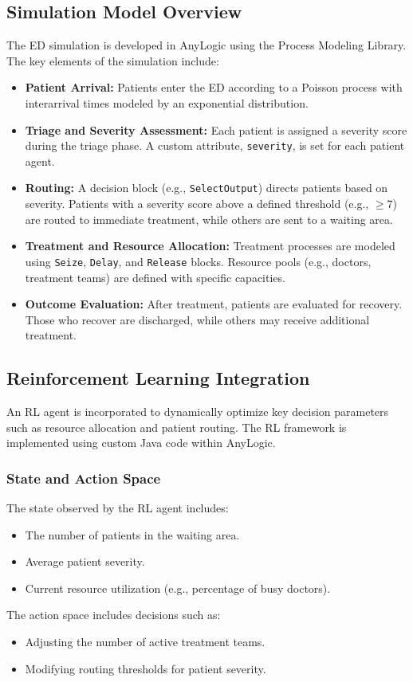 \documentclass[12pt]{article}
\begin{document}
\subsection{Simulation Model Overview}
The ED simulation is developed in AnyLogic using the Process Modeling Library. The key elements of the simulation include:
\begin{itemize}[noitemsep]
    \item \textbf{Patient Arrival:} Patients enter the ED according to a Poisson process with interarrival times modeled by an exponential distribution.
    \item \textbf{Triage and Severity Assessment:} Each patient is assigned a severity score during the triage phase. A custom attribute, \texttt{severity}, is set for each patient agent.
    \item \textbf{Routing:} A decision block (e.g., \texttt{SelectOutput}) directs patients based on severity. Patients with a severity score above a defined threshold (e.g., $\geq 7$) are routed to immediate treatment, while others are sent to a waiting area.
    \item \textbf{Treatment and Resource Allocation:} Treatment processes are modeled using \texttt{Seize}, \texttt{Delay}, and \texttt{Release} blocks. Resource pools (e.g., doctors, treatment teams) are defined with specific capacities.
    \item \textbf{Outcome Evaluation:} After treatment, patients are evaluated for recovery. Those who recover are discharged, while others may receive additional treatment.
\end{itemize}

\subsection{Reinforcement Learning Integration}
An RL agent is incorporated to dynamically optimize key decision parameters such as resource allocation and patient routing. The RL framework is implemented using custom Java code within AnyLogic.

\subsubsection{State and Action Space}
The state observed by the RL agent includes:
\begin{itemize}[noitemsep]
    \item The number of patients in the waiting area.
    \item Average patient severity.
    \item Current resource utilization (e.g., percentage of busy doctors).
\end{itemize}
The action space includes decisions such as:
\begin{itemize}[noitemsep]
    \item Adjusting the number of active treatment teams.
    \item Modifying routing thresholds for patient severity.
\end{itemize}
\end{document}
